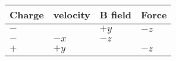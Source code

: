 		\begin{tabular}{||l|l|l|l||} \hline
		 Charge &  velocity & B field & Force\\ \hline\hline
		 $ - $ &        & $ +y $ & $ -z $ \\ \hline
		 $ - $ & $ -x $ & $ -z $ &        \\  \hline 
		 $ + $ & $ +y $ &        & $ -z $ \\  \hline 
		\end{tabular}
		
